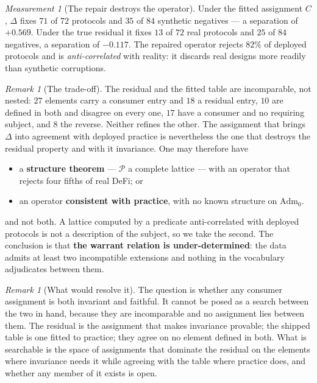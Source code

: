 \documentclass[11pt,reqno]{amsart}
\theoremstyle{plain}
\theoremstyle{definition}
\theoremstyle{remark}
\newtheorem{measurement}[theorem]{Measurement}
\newtheorem{remark}[theorem]{Remark}
\newcommand{\Pos}{\mathcal{P}}
\newcommand{\Adm}{\mathrm{Adm}_{0}}
\begin{document}
\begin{measurement}[The repair destroys the operator]\label{meas:tradeoff}
Under the fitted assignment $C$, $\Delta$ fixes $71$ of $72$ protocols and $35$ of
$84$ synthetic negatives --- a separation of $+0.569$. Under the true residual it
fixes $13$ of $72$ real protocols and $25$ of $84$ negatives, a separation of
$-0.117$. The repaired operator rejects $82\%$ of deployed protocols and is
\emph{anti-correlated} with reality: it discards real designs more readily than
synthetic corruptions.
\end{measurement}

\begin{remark}[The trade-off]
The residual and the fitted table are incomparable, not nested: $27$ elements
carry a consumer entry and $18$ a residual entry, $10$ are defined in both and
disagree on every one, $17$ have a consumer and no requiring subject, and $8$ the
reverse. Neither refines the other. The assignment that brings $\Delta$ into
agreement with deployed practice is nevertheless the one that destroys the
residual property and with it invariance. One may therefore have
\begin{itemize}
  \item a \textbf{structure theorem} --- $\Pos$ a complete lattice --- with an
    operator that rejects four fifths of real DeFi; or
  \item an operator \textbf{consistent with practice}, with no known structure on
    $\Adm$.
\end{itemize}
and not both. A lattice computed by a predicate anti-correlated with deployed
protocols is not a description of the subject, so we take the second. The
conclusion is that \textbf{the warrant relation is under-determined}: the data
admits at least two incompatible extensions and nothing in the vocabulary
adjudicates between them.
\end{remark}

\begin{remark}[What would resolve it]
The question is whether any consumer assignment is both invariant and
faithful. It cannot be posed as a search between the two in hand, because they
are incomparable and no assignment lies between them. The residual is the
assignment that makes invariance provable; the shipped table is one fitted to
practice; they agree on no element defined in both. What is searchable is the
space of assignments that dominate the residual on the elements where invariance
needs it while agreeing with the table where practice does, and whether any
member of it exists is open.
\end{remark}
\end{document}
